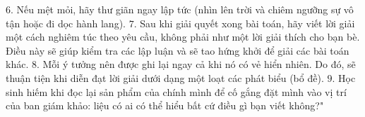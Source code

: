\begin{multicols}{2}
	\vskip 0.1cm
	$6.$ Nếu mệt mỏi, hãy thư giãn ngay lập tức (nhìn lên trời và chiêm ngưỡng sự vô tận hoặc đi dọc hành lang).
	\vskip 0.1cm
	$7.$ Sau khi giải quyết xong bài toán, hãy viết lời giải một cách nghiêm túc theo yêu cầu, không phải như một lời giải thích cho bạn bè. Điều này sẽ giúp kiểm tra các lập luận và sẽ tao hứng khởi để giải các bài toán khác.
	\vskip 0.1cm
	$8.$ Mỗi ý tưởng nên được ghi lại ngay cả khi nó có vẻ hiển nhiên. Do đó, sẽ thuận tiện khi diễn đạt lời giải dưới dạng một loạt các phát biểu (bổ đề).
	\vskip 0.1cm
	$9.$ Học sinh hiếm khi đọc lại sản phẩm của chính mình để cố gắng đặt mình vào vị trí của ban giám khảo: liệu có ai có thể hiểu bất cứ điều gì bạn viết không?"
	\vskip 0.1cm

\end{multicols}
